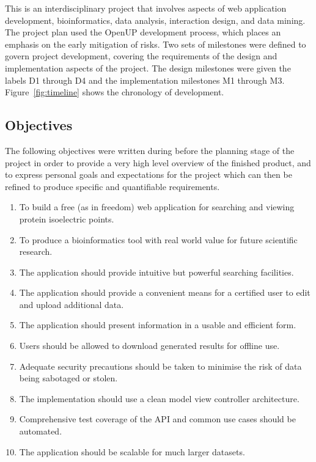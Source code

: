This is an interdisciplinary project that involves aspects of web
application development, bioinformatics, data analysis, interaction
design, and data mining. The project plan used the OpenUP development
process, which places an emphasis on the early mitigation of
risks. Two sets of milestones were defined to govern project
development, covering the requirements of the design and
implementation aspects of the project. The design milestones were
given the labels D1 through D4 and the implementation milestones M1
through M3. Figure~\ref{fig:timeline} shows the chronology of
development.

\newpage
\begin{multicols}{2}

\section*{Objectives}\label{sec:objectives}
The following objectives were written during before the planning stage
of the project in order to provide a very high level overview of the
finished product, and to express personal goals and expectations for
the project which can then be refined to produce specific and
quantifiable requirements.

\begin{enumerate}
\item To build a free (as in freedom) web application for searching
  and viewing protein isoelectric points.
\item To produce a bioinformatics tool with real world value for
  future scientific research.
\item The application should provide intuitive but powerful searching
  facilities.
\item The application should provide a convenient means for a
  certified user to edit and upload additional data.
\item The application should present information in a usable and
  efficient form.
\item Users should be allowed to download generated results for
  offline use.
\item Adequate security precautions should be taken to minimise the
  risk of data being sabotaged or stolen.
\item The implementation should use a clean model view controller
  architecture.
\item Comprehensive test coverage of the API and common use cases
  should be automated.
\item The application should be scalable for much larger datasets.
\end{enumerate}


\end{multicols}

